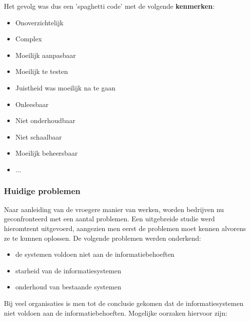Het gevolg was dus een 'spaghetti code’ met de volgende \textbf{kenmerken}:
\begin{multicols}{2}
\begin{itemize}
\item Onoverzichtelijk
\item Complex
\item Moeilijk aanpasbaar
\item Moeilijk te testen
\item Juistheid was moeilijk na te gaan
\item Onleesbaar
\item Niet onderhoudbaar
\item Niet schaalbaar
\item Moeilijk beheersbaar
\item ...
\end{itemize}
\end{multicols}

\subsubsection{Huidige problemen}

Naar aanleiding van de vroegere manier van werken, worden bedrijven nu geconfronteerd met een aantal problemen. Een uitgebreide studie werd hieromtrent uitgevoerd, aangezien men eerst de problemen moet kennen alvorens ze te kunnen oplossen. De volgende problemen werden onderkend:

\begin{itemize}
    \item de systemen voldoen niet aan de informatiebehoeften
    \item starheid van de informatiesystemen
    \item onderhoud van bestaande systemen
\end{itemize}



Bij veel organisaties is men tot de conclusie gekomen dat de informatiesystemen niet voldoen aan de informatiebehoeften. Mogelijke oorzaken hiervoor zijn:

